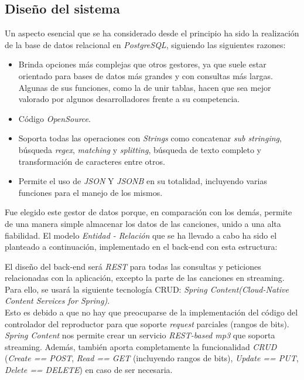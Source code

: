 \documentclass{article}
\begin{document}
\subsection{Diseño del sistema}
Un aspecto esencial que se ha considerado desde el principio ha sido la realización de la base de datos relacional en \textit{PostgreSQL}, siguiendo las siguientes razones:
\begin{itemize}
	\item Brinda opciones más complejas que otros gestores, ya que suele estar orientado para bases de datos más grandes y con consultas más largas. Algunas de sus funciones, como la de unir tablas, hacen que sea mejor valorado por algunos desarrolladores frente a su competencia.
	\item Código \textit{OpenSource}.
	\item Soporta todas las operaciones con \textit{Strings} como concatenar \textit{sub stringing}, búsqueda \textit{regex}, \textit{matching} y \textit{splitting}, búsqueda de texto completo y transformación de caracteres entre otros.
	\item Permite el uso de \textit{JSON} Y \textit{JSONB} en su totalidad, incluyendo varias funciones para el manejo de los mismos.
\end{itemize}
Fue elegido este gestor de datos porque, en comparación con los demás, permite de una manera simple almacenar los datos de las canciones, unido a una alta fiabilidad.
\newpage
El modelo \textit{Entidad - Relación} que se ha llevado a cabo ha sido el planteado a continuación, implementado en el back-end con esta estructura:
\begin{figure}[H]
	\hspace*{-3.9cm}
\end{figure}
El diseño del back-end será \textit{REST} para todas las consultas y peticiones relacionadas con la aplicación, excepto la parte de las canciones en streaming. Para ello, se usará la siguiente tecnología CRUD: \textit{Spring Content(Cloud-Native Content Services for Spring)}. \\
\hfill \break
Esto es debido a que no hay que preocuparse de la implementación del código del controlador del reproductor para que soporte \textit{request} parciales (rangos de bits).\hfill \break
\textit{Spring Content} nos permite crear un servicio \textit{REST-based mp3}  que soporta streaming. Además, también aporta completamente la funcionalidad \textit{CRUD} (\textit{Create == POST}, \textit{Read == GET} (incluyendo rangos de bits), \textit{Update == PUT}, \textit{Delete == DELETE}) en caso de ser necesaria.
\end{document}
